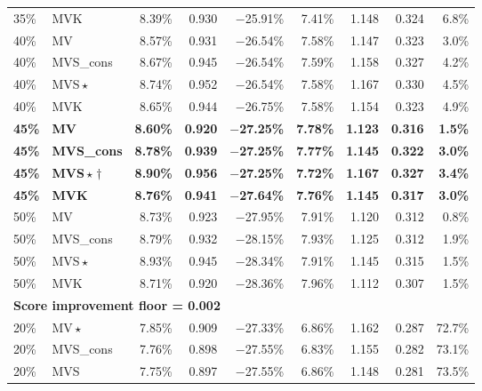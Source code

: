 \documentclass[12pt, a4paper]{article}
\begin{document}
\begin{longtable}{llrrrrrrr}
35\% & MVK          & 8.39\% & 0.930 & $-$25.91\% & 7.41\% & 1.148 & 0.324 &  6.8\% \\[3pt]
40\% & MV           & 8.57\% & 0.931 & $-$26.54\% & 7.58\% & 1.147 & 0.323 &  3.0\% \\
40\% & MVS\_cons    & 8.67\% & 0.945 & $-$26.54\% & 7.59\% & 1.158 & 0.327 &  4.2\% \\
40\% & MVS\,$\star$ & 8.74\% & 0.952 & $-$26.54\% & 7.58\% & 1.167 & 0.330 &  4.5\% \\
40\% & MVK          & 8.65\% & 0.944 & $-$26.75\% & 7.58\% & 1.154 & 0.323 &  4.9\% \\[3pt]
\textbf{45\%} & \textbf{MV}            & \textbf{8.60\%} & \textbf{0.920} & $\mathbf{-}$\textbf{27.25\%} & \textbf{7.78\%} & \textbf{1.123} & \textbf{0.316} & \textbf{1.5\%} \\
\textbf{45\%} & \textbf{MVS\_cons}     & \textbf{8.78\%} & \textbf{0.939} & $\mathbf{-}$\textbf{27.25\%} & \textbf{7.77\%} & \textbf{1.145} & \textbf{0.322} & \textbf{3.0\%} \\
\textbf{45\%} & \textbf{MVS}\,$\star\dagger$ & \textbf{8.90\%} & \textbf{0.956} & $\mathbf{-}$\textbf{27.25\%} & \textbf{7.72\%} & \textbf{1.167} & \textbf{0.327} & \textbf{3.4\%} \\
\textbf{45\%} & \textbf{MVK}           & \textbf{8.76\%} & \textbf{0.941} & $\mathbf{-}$\textbf{27.64\%} & \textbf{7.76\%} & \textbf{1.145} & \textbf{0.317} & \textbf{3.0\%} \\[3pt]
50\% & MV           & 8.73\% & 0.923 & $-$27.95\% & 7.91\% & 1.120 & 0.312 &  0.8\% \\
50\% & MVS\_cons    & 8.79\% & 0.932 & $-$28.15\% & 7.93\% & 1.125 & 0.312 &  1.9\% \\
50\% & MVS\,$\star$ & 8.93\% & 0.945 & $-$28.34\% & 7.91\% & 1.145 & 0.315 &  1.5\% \\
50\% & MVK          & 8.71\% & 0.920 & $-$28.36\% & 7.96\% & 1.112 & 0.307 &  1.5\% \\[6pt]
\multicolumn{9}{l}{\textbf{Score improvement floor = 0.002}} \\[2pt]
20\% & MV\,$\star$  & 7.85\% & 0.909 & $-$27.33\% & 6.86\% & 1.162 & 0.287 & 72.7\% \\
20\% & MVS\_cons    & 7.76\% & 0.898 & $-$27.55\% & 6.83\% & 1.155 & 0.282 & 73.1\% \\
20\% & MVS          & 7.75\% & 0.897 & $-$27.55\% & 6.86\% & 1.148 & 0.281 & 73.5\% \\

\end{longtable}
\end{document}
